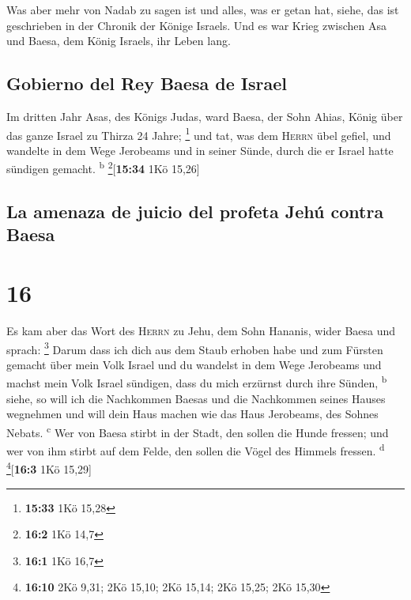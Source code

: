  Was aber mehr von Nadab zu sagen ist und alles, was er
getan hat, siehe, das ist geschrieben in der Chronik der Könige Israels.
 Und es war Krieg zwischen Asa und Baesa, dem König
Israels, ihr Leben lang.

\hypertarget{gobierno-del-rey-baesa-de-israel}{%
\subsection{Gobierno del Rey Baesa de
Israel}\label{gobierno-del-rey-baesa-de-israel}}

 Im dritten Jahr Asas, des Königs Judas, ward Baesa, der
Sohn Ahias, König über das ganze Israel zu Thirza 24 Jahre; \footnote{\textbf{15:33}
  1Kö 15,28}  und tat, was dem \textsc{Herrn} übel
gefiel, und wandelte in dem Wege Jerobeams und in seiner Sünde, durch
die er Israel hatte sündigen gemacht. \textsuperscript{b}
\footnote{\textbf{16:2} 1Kö 14,7}{[}\textbf{15:34} 1Kö 15,26{]}

\hypertarget{la-amenaza-de-juicio-del-profeta-jehuxfa-contra-baesa}{%
\subsection{La amenaza de juicio del profeta Jehú contra
Baesa}\label{la-amenaza-de-juicio-del-profeta-jehuxfa-contra-baesa}}

\hypertarget{section-15}{%
\section{16}\label{section-15}}

 Es kam aber das Wort des \textsc{Herrn} zu Jehu, dem Sohn
Hananis, wider Baesa und sprach: \footnote{\textbf{16:1} 1Kö 16,7}
 Darum dass ich dich aus dem Staub erhoben habe und zum
Fürsten gemacht über mein Volk Israel und du wandelst in dem Wege
Jerobeams und machst mein Volk Israel sündigen, dass du mich erzürnst
durch ihre Sünden, \textsuperscript{b}  siehe, so will ich
die Nachkommen Baesas und die Nachkommen seines Hauses wegnehmen und
will dein Haus machen wie das Haus Jerobeams, des Sohnes Nebats.
\textsuperscript{c}  Wer von Baesa stirbt in der Stadt,
den sollen die Hunde fressen; und wer von ihm stirbt auf dem Felde, den
sollen die Vögel des Himmels fressen. \textsuperscript{d}
\footnote{\textbf{16:10} 2Kö 9,31; 2Kö 15,10; 2Kö 15,14; 2Kö 15,25; 2Kö
  15,30}{[}\textbf{16:3} 1Kö 15,29{]}

